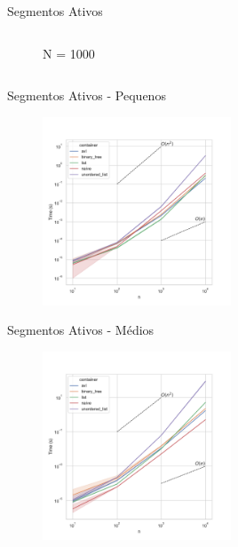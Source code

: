 \documentclass[aspectratio=169,usenames,dvipsnames]{beamer}
\begin{document}
\begin{frame}{Segmentos Ativos}
\begin{columns}
\begin{column}{0.5\textwidth}
\begin{figure}
        \caption{N = 1000 }
      \end{figure}
    \end{column}
  \end{columns}
 

\end{frame}

\begin{frame}{Segmentos Ativos - Pequenos}
      \begin{figure}
        \includegraphics[width=0.5\textwidth]{figs/tempos/plot_random_small_time.pdf}
      \end{figure}
\end{frame}

\begin{frame}{Segmentos Ativos - Médios}
      \begin{figure}
        \includegraphics[width=0.5\textwidth]{figs/tempos/plot_random_medium_time.pdf}
      \end{figure}
\end{frame}
\end{document}

